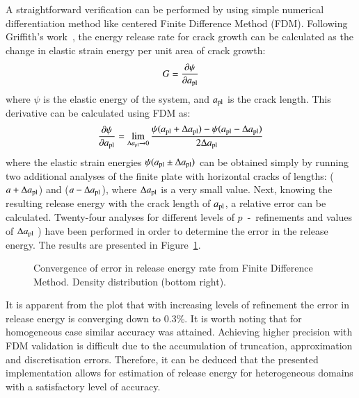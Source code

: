 \documentclass[review]{elsarticle}
\numberwithin{equation}{section}
\begin{document}
A straightforward verification can be performed by using simple numerical differentiation method like centered Finite Difference Method (FDM). Following Griffith's work~\citep{Griffith163}, the energy release rate for crack growth can be calculated as the change in elastic strain energy per unit area of crack growth:
\begin{equation}
G = \frac{\partial \psi}{\partial a_{\rm {pl}}}
\end{equation}
where $\psi$ is the elastic energy of the system, and $a_{\rm{pl}}$ is the crack length. This derivative can be calculated using FDM as:
\begin{equation}
 \frac{\partial \psi}{\partial a_{\rm {pl}}} = \lim_{\Delta a_{\rm {pl}} \to 0} \frac{\psi(a_{\rm {pl}} + \Delta a_{\rm {pl}}) - \psi(a_{\rm {pl}} -\Delta a_{\rm {pl}})}{2\Delta a_{\rm {pl}}}
\end{equation}
where the elastic strain energies $\psi(a_{\rm {pl}} \pm \Delta a_{\rm {pl}})$ can be obtained simply by running two additional analyses of the finite plate with horizontal cracks of lengths: ($a + \Delta a_{\rm {pl}}$) and ($a - \Delta a_{\rm {pl}}$), where $\Delta a_{\rm {pl}}$ is a very small value. 
Next, knowing the resulting release energy with the crack length of $a_{\rm {pl}}$, a relative error can be calculated. 
Twenty-four analyses for different levels of $p$~-~refinements and values of $\Delta a_{\rm {pl}}$ ) have been performed in order to determine the error in the release energy. 
The results are presented in Figure~\ref{fig:covergencefdm}.
\begin{figure}[h]
	\centering
	\caption{Convergence of error in release energy rate from Finite Difference Method. Density distribution (bottom right).}
	\label{fig:covergencefdm}
\end{figure}
It is apparent from the plot that with increasing levels of refinement the error in release energy is converging down to 0.3\%. It is worth noting that for homogeneous case similar accuracy was attained.  Achieving higher precision with FDM validation is difficult due to the accumulation of truncation, approximation and discretisation errors.
Therefore, it can be deduced that the presented implementation allows for estimation of release energy for heterogeneous domains with a satisfactory level of accuracy.
\end{document}
